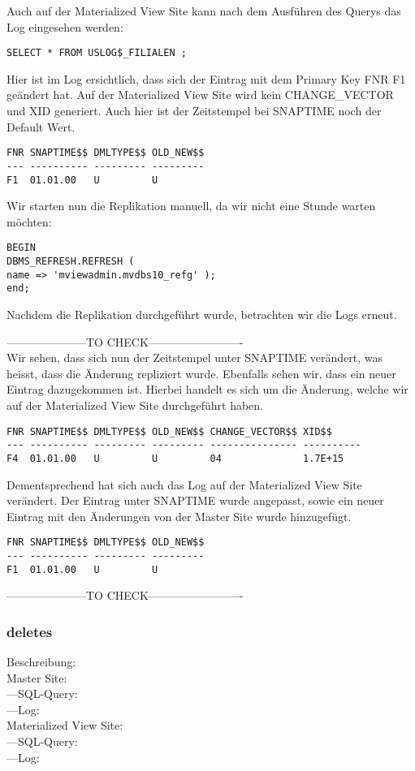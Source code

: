\documentclass[11pt,a4paper,parskip=half]{scrartcl}
\begin{document}
Auch auf der Materialized View Site kann nach dem Ausführen des Querys das Log eingesehen werden:
\begin{lstlisting}
SELECT * FROM USLOG$_FILIALEN ;
\end{lstlisting}

Hier ist im Log ersichtlich, dass sich der Eintrag mit dem Primary Key FNR F1 geändert hat. Auf der Materialized View Site wird kein CHANGE\_VECTOR und XID generiert. Auch hier ist der Zeitstempel bei SNAPTIME noch der Default Wert.
\begin{lstlisting}
FNR SNAPTIME$$ DMLTYPE$$ OLD_NEW$$
--- ---------- --------- ---------
F1  01.01.00   U         U         
\end{lstlisting}

Wir starten nun die Replikation manuell, da wir nicht eine Stunde warten möchten:
\begin{lstlisting}
BEGIN
DBMS_REFRESH.REFRESH (
name => 'mviewadmin.mvdbs10_refg' );
end;
\end{lstlisting}

Nachdem die Replikation durchgeführt wurde, betrachten wir die Logs erneut.

---------------------TO CHECK-------------------------\\
Wir sehen, dass sich nun der Zeitstempel unter SNAPTIME verändert, was heisst, dass die Änderung repliziert wurde. Ebenfalls sehen wir, dass ein neuer Eintrag dazugekommen ist. Hierbei handelt es sich um die Änderung, welche wir auf der Materialized View Site durchgeführt haben.
\begin{lstlisting}
FNR SNAPTIME$$ DMLTYPE$$ OLD_NEW$$ CHANGE_VECTOR$$ XID$$
--- ---------- --------- --------- --------------- ----------
F4  01.01.00   U         U         04              1.7E+15 
\end{lstlisting}

Dementsprechend hat sich auch das Log auf der Materialized View Site verändert. Der Eintrag unter SNAPTIME wurde angepasst, sowie ein neuer Eintrag mit den Änderungen von der Master Site wurde hinzugefügt.
\begin{lstlisting}
FNR SNAPTIME$$ DMLTYPE$$ OLD_NEW$$
--- ---------- --------- ---------
F1  01.01.00   U         U         
\end{lstlisting}
---------------------TO CHECK-------------------------


\subsubsection{deletes}
Beschreibung:\\
Master Site:\\
	---SQL-Query:\\
	---Log:\\
Materialized View Site:\\
	---SQL-Query:\\
	---Log:\\
\end{document}

